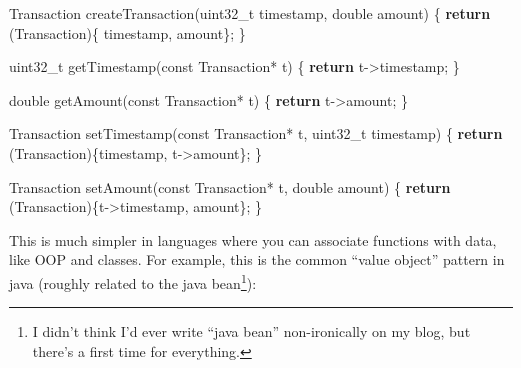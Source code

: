\documentclass[]{article}
\newenvironment{Shaded}{}{}
\newcommand{\ControlFlowTok}[1]{\textcolor[rgb]{0.00,0.44,0.13}{\textbf{#1}}}
\newcommand{\DataTypeTok}[1]{\textcolor[rgb]{0.56,0.13,0.00}{#1}}
\newcommand{\NormalTok}[1]{#1}
\newcommand{\OperatorTok}[1]{\textcolor[rgb]{0.40,0.40,0.40}{#1}}
\begin{document}
\begin{Shaded}
\begin{Highlighting}[]
\NormalTok{Transaction createTransaction}\OperatorTok{(}\DataTypeTok{uint32\_t}\NormalTok{ timestamp}\OperatorTok{,} \DataTypeTok{double}\NormalTok{ amount}\OperatorTok{)} \OperatorTok{\{}
    \ControlFlowTok{return} \OperatorTok{(}\NormalTok{Transaction}\OperatorTok{)\{}\NormalTok{ timestamp}\OperatorTok{,}\NormalTok{ amount}\OperatorTok{\};}
\OperatorTok{\}}

\DataTypeTok{uint32\_t}\NormalTok{ getTimestamp}\OperatorTok{(}\DataTypeTok{const}\NormalTok{ Transaction}\OperatorTok{*}\NormalTok{ t}\OperatorTok{)} \OperatorTok{\{}
    \ControlFlowTok{return}\NormalTok{ t}\OperatorTok{{-}\textgreater{}}\NormalTok{timestamp}\OperatorTok{;}
\OperatorTok{\}}

\DataTypeTok{double}\NormalTok{ getAmount}\OperatorTok{(}\DataTypeTok{const}\NormalTok{ Transaction}\OperatorTok{*}\NormalTok{ t}\OperatorTok{)} \OperatorTok{\{}
    \ControlFlowTok{return}\NormalTok{ t}\OperatorTok{{-}\textgreater{}}\NormalTok{amount}\OperatorTok{;}
\OperatorTok{\}}

\NormalTok{Transaction setTimestamp}\OperatorTok{(}\DataTypeTok{const}\NormalTok{ Transaction}\OperatorTok{*}\NormalTok{ t}\OperatorTok{,} \DataTypeTok{uint32\_t}\NormalTok{ timestamp}\OperatorTok{)} \OperatorTok{\{}
    \ControlFlowTok{return} \OperatorTok{(}\NormalTok{Transaction}\OperatorTok{)\{}\NormalTok{timestamp}\OperatorTok{,}\NormalTok{ t}\OperatorTok{{-}\textgreater{}}\NormalTok{amount}\OperatorTok{\};}
\OperatorTok{\}}

\NormalTok{Transaction setAmount}\OperatorTok{(}\DataTypeTok{const}\NormalTok{ Transaction}\OperatorTok{*}\NormalTok{ t}\OperatorTok{,} \DataTypeTok{double}\NormalTok{ amount}\OperatorTok{)} \OperatorTok{\{}
    \ControlFlowTok{return} \OperatorTok{(}\NormalTok{Transaction}\OperatorTok{)\{}\NormalTok{t}\OperatorTok{{-}\textgreater{}}\NormalTok{timestamp}\OperatorTok{,}\NormalTok{ amount}\OperatorTok{\};}
\OperatorTok{\}}
\end{Highlighting}
\end{Shaded}

This is much simpler in languages where you can associate functions with data,
like OOP and classes. For example, this is the common ``value object'' pattern
in java (roughly related to the java bean\footnote{I didn't think I'd ever write
  ``java bean'' non-ironically on my blog, but there's a first time for
  everything.}):
\end{document}
